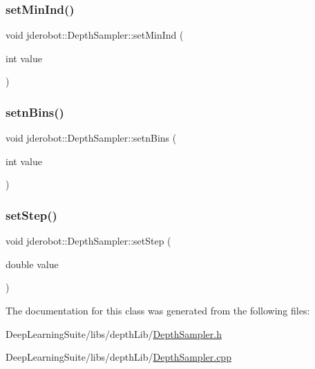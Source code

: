 \mbox{\label{classjderobot_1_1_depth_sampler_a56f8d0604fb9e97cc295baad9092d3b6}} 
\subsubsection{\texorpdfstring{set\+Min\+Ind()}{setMinInd()}}
{\footnotesize\ttfamily void jderobot\+::\+Depth\+Sampler\+::set\+Min\+Ind (\begin{DoxyParamCaption}\item[{int}]{value }\end{DoxyParamCaption})\hspace{0.3cm}{\ttfamily [inline]}}

\mbox{\label{classjderobot_1_1_depth_sampler_ac3c4d83a723a16b2c66f5999de69fadb}} 
\subsubsection{\texorpdfstring{setn\+Bins()}{setnBins()}}
{\footnotesize\ttfamily void jderobot\+::\+Depth\+Sampler\+::setn\+Bins (\begin{DoxyParamCaption}\item[{int}]{value }\end{DoxyParamCaption})\hspace{0.3cm}{\ttfamily [inline]}}

\mbox{\label{classjderobot_1_1_depth_sampler_ad5dc4b9beb677e517e7c7ad87b16720b}} 
\subsubsection{\texorpdfstring{set\+Step()}{setStep()}}
{\footnotesize\ttfamily void jderobot\+::\+Depth\+Sampler\+::set\+Step (\begin{DoxyParamCaption}\item[{double}]{value }\end{DoxyParamCaption})\hspace{0.3cm}{\ttfamily [inline]}}



The documentation for this class was generated from the following files\+:\begin{DoxyCompactItemize}
\item 
Deep\+Learning\+Suite/libs/depth\+Lib/\hyperlink{_depth_sampler_8h}{Depth\+Sampler.\+h}\item 
Deep\+Learning\+Suite/libs/depth\+Lib/\hyperlink{_depth_sampler_8cpp}{Depth\+Sampler.\+cpp}\end{DoxyCompactItemize}
